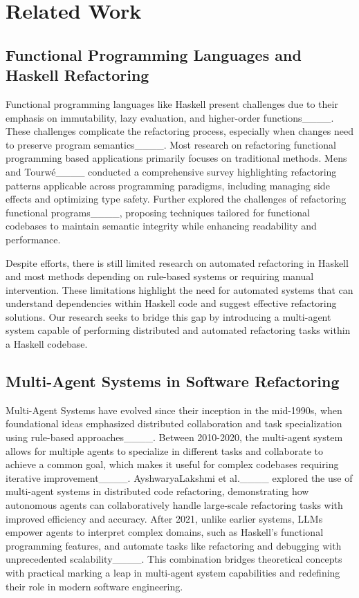 \section{Related Work}
\label{sec:rw}
\subsection{Functional Programming Languages and Haskell Refactoring}

Functional programming languages like Haskell present challenges due to their emphasis on immutability, lazy evaluation, and higher-order functions____. These
challenges complicate the refactoring process, especially when changes need to preserve program semantics____. Most research on refactoring functional programming based applications primarily focuses on traditional methods. Mens and Tourwé____ conducted a comprehensive survey highlighting refactoring patterns applicable across programming paradigms, including managing side effects and optimizing type safety. Further explored the challenges of refactoring functional programs____, proposing techniques tailored for functional codebases to maintain semantic integrity while enhancing readability and performance.

Despite efforts, there is still limited research on automated refactoring in Haskell and most methods depending on rule-based systems or requiring manual intervention. These limitations highlight the need for automated systems that can understand dependencies within Haskell code and suggest effective refactoring solutions. Our research seeks to bridge this gap by introducing a multi-agent system capable of performing distributed and automated refactoring tasks within a Haskell codebase.


\subsection{Multi-Agent Systems in Software Refactoring}

Multi-Agent Systems have evolved since their inception in the mid-1990s, when foundational ideas emphasized distributed collaboration and task specialization using rule-based approaches____. Between 2010-2020, the multi-agent system allows for multiple agents to specialize in different tasks and collaborate to achieve a common goal, which makes it useful for complex codebases requiring iterative improvement____. AyshwaryaLakshmi et al.____ explored the use of multi-agent systems in distributed code refactoring, demonstrating how autonomous agents can collaboratively handle large-scale refactoring tasks with improved efficiency and accuracy. After 2021, unlike earlier systems, LLMs empower agents to interpret complex domains, such as Haskell's functional programming features, and automate tasks like refactoring and debugging with unprecedented scalability____. This combination bridges theoretical concepts with practical marking a leap in multi-agent system capabilities and redefining their role in modern software engineering.

